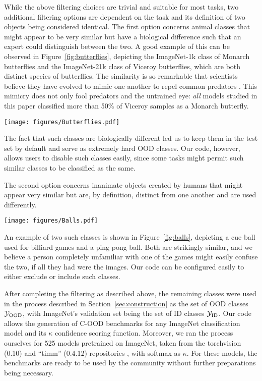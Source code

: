 \documentclass[table]{article} \usepackage{PRIMEarxiv}
\newcommand{\cY}{{\cal Y}}
\begin{document}
While the above filtering choices are trivial and suitable for most tasks, two additional filtering options are dependent on the task and its definition of two objects being considered identical.
The first option concerns animal classes that might appear to be very similar but have a biological difference such that an expert could distinguish between the two. A good example of this can be observed in Figure~\ref{fig:butterflies}, depicting the ImageNet-1k class of Monarch butterflies and the ImageNet-21k class of Viceroy butterflies, which are both distinct species of butterflies. The similarity is so remarkable that scientists believe they have evolved to mimic one another to repel common predators \citep{Ritland1991}. This mimicry does not only fool predators and the untrained eye: \emph{all} models studied in this paper classified more than 50\% of Viceroy samples as a Monarch butterfly.
\begin{figure*}[h]
    \centering
\texttt{[image: figures/Butterflies.pdf]}
    \caption{While both butterflies appear very similar, a Viceroy can be distinguished from a Monarch by a black line crossing its postmedian hindwing. The red arrow on the Viceroy image indicates this black line.}
    \label{fig:butterflies}
\end{figure*}
The fact that such classes are biologically different led us to keep them in the test set by default and serve as extremely hard OOD classes. Our code, however, allows users to disable such classes easily, since some tasks might permit such similar classes to be classified as the same.

The second option concerns inanimate objects created by humans that might appear very similar but are, by definition, distinct from one another and are used differently.
\begin{figure*}[h]
    \centering
\texttt{[image: figures/Balls.pdf]}
    \caption{While both balls appear similar, they are distinguished by their different uses.}
    \label{fig:balls}
\end{figure*}
An example of two such classes is shown in Figure~\ref{fig:balls}, depicting a cue ball used for billiard games and a ping pong ball. Both are strikingly similar, and we believe a person completely unfamiliar with one of the games might easily confuse the two, if all they had were the images. 
Our code can be configured easily to either exclude or include such classes.

After completing the filtering as described above, the remaining classes were used in the process described in Section~\ref{sec:construction} as the set of OOD classes $\cY_{\text{OOD}}$, with ImageNet's validation set being the set of ID classes $\cY_{\text{ID}}$.
Our code allows the generation of C-OOD benchmarks for any ImageNet classification model and its $\kappa$ confidence scoring function. Moreover, we ran the process ourselves for 525 models pretrained on ImageNet, 
taken from the torchvision (0.10) and ``timm'' (0.4.12)
repositories \citep{NEURIPS2019_9015, rw2019timm}, with softmax as $\kappa$. For these models, the benchmarks are ready to be used by the community without further preparations being necessary.
\end{document}
